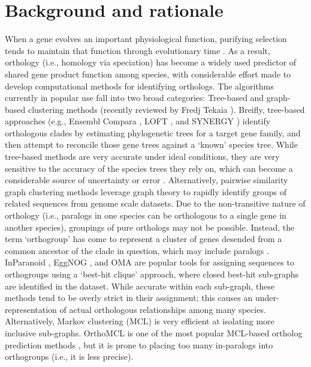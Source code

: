 \documentclass[twocolumn]{bmcart}%
\begin{document}
\section*{Background and rationale}
When a gene evolves an important physiological function, purifying selection tends to maintain that function through evolutionary time \cite{Altenhoff:2012ea, Rogozin:2014fp, KryuchkovaMostacci:2016iw}. As a result, orthology (i.e., homology via speciation) has become a widely used predictor of shared gene product function among species, with considerable effort made to develop computational methods for identifying orthologs. The algorithms currently in popular use fall into two broad categories: Tree-based and graph-based clustering methods (recently reviewed by Fredj Tekaia \cite{Tekaia:2016ga}). Breifly, tree-based approaches (e.g., Ensembl Compara \cite{Vilella:2009ju}, LOFT \cite{vanderHeijden:2007bo}, and SYNERGY \cite{Wapinski:2007fa}) identify orthologous clades by estimating phylogenetic trees for a target gene family, and then attempt to reconcile those gene trees against a `known' species tree. While tree-based methods are very accurate under ideal conditions, they are very sensitive to the accuracy of the species trees they rely on, which can become a considerable source of uncertainty or error \cite{Xu:2016ek}. Alternatively, pairwise similarity graph clustering methods leverage graph theory to rapidly identify groups of related sequences from genome scale datasets. Due to the non-transitive nature of orthology (i.e., paralogs in one species can be orthologous to a single gene in another species), groupings of pure orthologs may not be possible. Instead, the term `orthogroup' has come to represent a cluster of genes desended from a common ancestor of the clade in question, which may include paralogs \cite{Wapinski:2007fa}. InParanoid \cite{OBrien:2005cy}, EggNOG \cite{Jensen:2007cc}, and OMA \cite{Roth:2009iu} are popular tools for assigning sequences to orthogroups using a `best-hit clique' approach, where closed best-hit sub-graphs are identified in the dataset. While accurate within each sub-graph, these methods tend to be overly strict in their assignment; this causes an under-representation of actual orthologous relationships among many species. Alternatively, Markov clustering (MCL) is very efficient at isolating more inclusive sub-graphs. OrthoMCL is one of the most popular MCL-based ortholog prediction methods \cite{Li:2003en}, but it is prone to placing too many in-paralogs into orthogroups (i.e., it is less precise).
\end{document}
